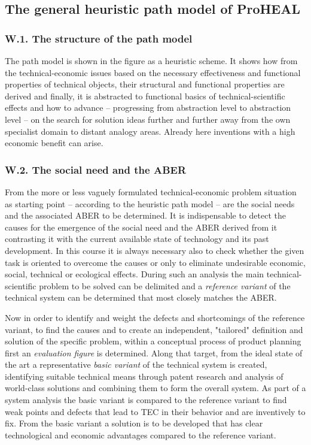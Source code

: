 \documentclass[11pt,a4paper]{article}
\begin{document}
\subsection{The general heuristic path model of ProHEAL}

\subsubsection*{W.1. The structure of the path model}

The path model is shown in the figure as a heuristic scheme. It shows how from
the technical-economic issues based on the necessary effectiveness and
functional properties of technical objects, their structural and functional
properties are derived and finally, it is abstracted to functional basics of
technical-scientific effects and how to advance -- progressing from
abstraction level to abstraction level -- on the search for solution ideas
further and further away from the own specialist domain to distant analogy
areas.  Already here inventions with a high economic benefit can arise.

\subsubsection*{W.2. The social need and the ABER}

From the more or less vaguely formulated technical-economic problem situation
as starting point -- according to the heuristic path model -- are the social
needs and the associated ABER to be determined. It is indispensable to detect
the causes for the emergence of the social need and the ABER derived from it
contrasting it with the current available state of technology and its past
development.  In this course it is always necessary also to check whether the
given task is oriented to overcome the causes or only to eliminate undesirable
economic, social, technical or ecological effects.  During such an analysis
the main technical-scientific problem to be solved can be delimited and a
\emph{reference variant} of the technical system can be determined that most
closely matches the ABER.

Now in order to identify and weight the defects and shortcomings of the
reference variant, to find the causes and to create an independent, "tailored"
definition and solution of the specific problem, within a conceptual process
of product planning first an \emph{evaluation figure} is determined. Along that
target, from the ideal state of the art a representative \emph{basic variant}
of the technical system is created, identifying suitable technical means
through patent research and analysis of world-class solutions and combining
them to form the overall system. As part of a system analysis the basic
variant is compared to the reference variant to find weak points and defects
that lead to TEC in their behavior and are inventively to fix. From the basic
variant a solution is to be developed that has clear technological and
economic advantages compared to the reference variant.
\end{document}
